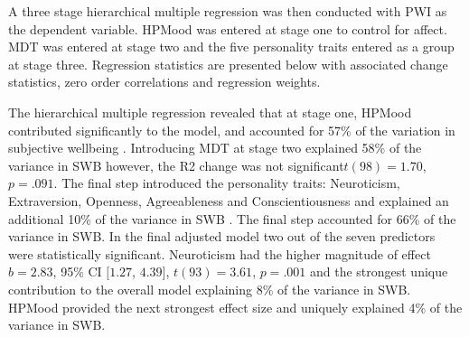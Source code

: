 \documentclass[man,floatsintext]{apa6}
\begin{document}
A three stage hierarchical multiple regression was then conducted with
PWI as the dependent variable. HPMood was entered at stage one to
control for affect. MDT was entered at stage two and the five
personality traits entered as a group at stage three. Regression
statistics are presented below with associated change statistics, zero
order correlations and regression weights.

The hierarchical multiple regression revealed that at stage one, HPMood
contributed significantly to the model, and accounted for 57\% of the
variation in subjective wellbeing . Introducing MDT at stage two
explained 58\% of the variance in SWB however, the R2 change was not
significant\(t(98) = 1.70\), \(p = .091\). The final step introduced the
personality traits: Neuroticism, Extraversion, Openness, Agreeableness
and Conscientiousness and explained an additional 10\% of the variance
in SWB . The final step accounted for 66\% of the variance in SWB. In
the final adjusted model two out of the seven predictors were
statistically significant. Neuroticism had the higher magnitude of
effect \(b = 2.83\), 95\% CI \([1.27\), \(4.39]\), \(t(93) = 3.61\),
\(p = .001\) and the strongest unique contribution to the overall model
explaining 8\% of the variance in SWB. HPMood provided the next
strongest effect size and uniquely explained 4\% of the variance in SWB.
\end{document}
